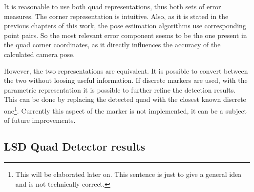 It is reasonable to use both quad representations, thus both sets of error measures.
The corner representation is intuitive.
Also, as it is stated in the previous chapters of this work, the pose estimation algorithms use corresponding point pairs.
So the most relevant error component seems to be the one present in the quad corner coordinates, as it directly influences the accuracy of the calculated camera pose.

However, the two representations are equivalent.
It is possible to convert between the two without loosing useful information.
If discrete markers are used, with the parametric representation it is possible to further refine the detection results.
This can be done by replacing the detected quad with the closest known discrete one\footnote{This will be elaborated later on. This sentence is just to give a general idea and is not technically correct.}.
Currently this aspect of the marker is not implemented, it can be a subject of future improvements.

\subsection{LSD Quad Detector results}

